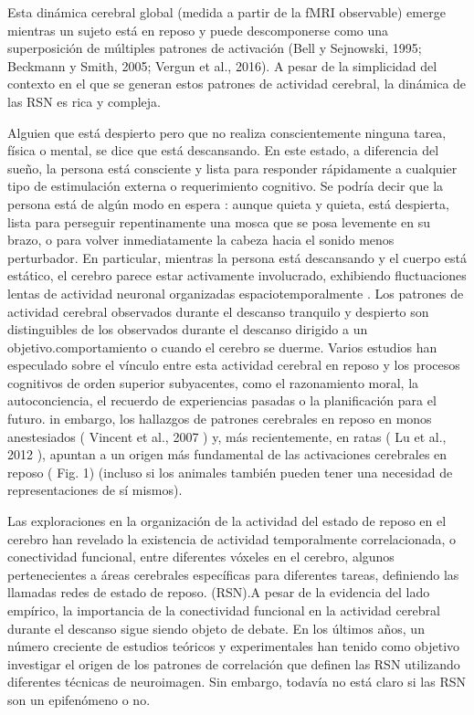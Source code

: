 Esta dinámica cerebral global (medida a partir de la fMRI observable) emerge mientras un sujeto está en reposo y puede descomponerse como una superposición de múltiples patrones de activación (Bell y Sejnowski, 1995; Beckmann y Smith, 2005; Vergun et al., 2016). A pesar de la simplicidad del contexto en el que se generan estos patrones de actividad cerebral, la dinámica de las RSN es rica y compleja.


Alguien que está despierto pero que no realiza conscientemente ninguna tarea, física o mental, se dice que está descansando. En este estado, a diferencia del sueño, la persona está consciente y lista para responder rápidamente a cualquier tipo de estimulación externa o requerimiento cognitivo. Se podría decir que la persona está de algún modo en espera : aunque quieta y quieta, está despierta, lista para perseguir repentinamente una mosca que se posa levemente en su brazo, o para volver inmediatamente la cabeza hacia el sonido menos perturbador. En particular, mientras la persona está descansando y el cuerpo está estático, el cerebro parece estar activamente involucrado, exhibiendo fluctuaciones lentas de actividad neuronal organizadas espaciotemporalmente . Los patrones de actividad cerebral observados durante el descanso tranquilo y despierto son distinguibles de los observados durante el descanso dirigido a un objetivo.comportamiento o cuando el cerebro se duerme.
Varios estudios han especulado sobre el vínculo entre esta actividad cerebral en reposo y los procesos cognitivos de orden superior subyacentes, como el razonamiento moral, la autoconciencia, el recuerdo de experiencias pasadas o la planificación para el futuro. in embargo, los hallazgos de patrones cerebrales en reposo en monos anestesiados ( Vincent et al., 2007 ) y, más recientemente, en ratas ( Lu et al., 2012 ), apuntan a un origen más fundamental de las activaciones cerebrales en reposo ( Fig. 1) (incluso si los animales también pueden tener una necesidad de representaciones de sí mismos).

Las exploraciones en la organización de la actividad del estado de reposo en el cerebro han revelado la existencia de actividad temporalmente correlacionada, o conectividad funcional, entre diferentes vóxeles en el cerebro, algunos pertenecientes a áreas cerebrales específicas para diferentes tareas, definiendo las llamadas redes de estado de reposo. (RSN).A pesar de la evidencia del lado empírico, la importancia de la conectividad funcional en la actividad cerebral durante el descanso sigue siendo objeto de debate. En los últimos años, un número creciente de estudios teóricos y experimentales han tenido como objetivo investigar el origen de los patrones de correlación que definen las RSN utilizando diferentes técnicas de neuroimagen. Sin embargo, todavía no está claro si las RSN son un epifenómeno o no.


